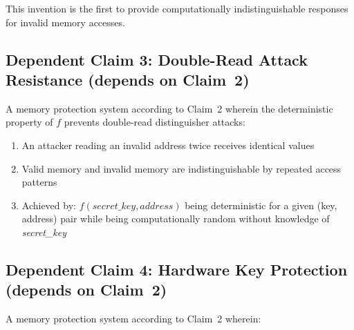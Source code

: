 \documentclass[12pt,letterpaper]{article}
\begin{document}
This invention is the first to provide computationally indistinguishable responses
for invalid memory accesses.

\medskip

\subsection*{Dependent Claim 3: Double-Read Attack Resistance
  (depends on Claim~2)}

A memory protection system according to Claim~2 wherein the deterministic
property of $f$ prevents double-read distinguisher attacks:

\begin{enumerate}[label=(\alph*),noitemsep]
  \item An attacker reading an invalid address twice receives identical values
  \item Valid memory and invalid memory are indistinguishable by repeated
        access patterns
  \item Achieved by: $f(\textit{secret\_key}, \textit{address})$ being
        deterministic for a given (key, address) pair while being computationally
        random without knowledge of \textit{secret\_key}
\end{enumerate}

\medskip

\subsection*{Dependent Claim 4: Hardware Key Protection
  (depends on Claim~2)}

A memory protection system according to Claim~2 wherein:
\end{document}
